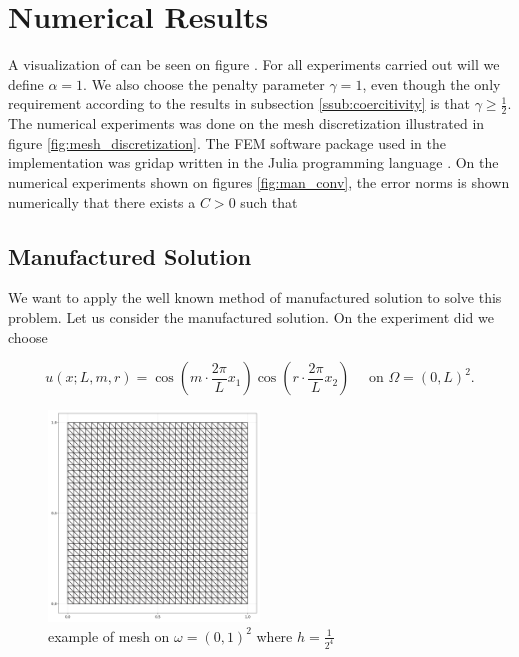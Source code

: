 

\newpage
\section{Numerical Results}%
\label{sec:numerical_results}


A visualization of  can be seen on figure .
For all experiments carried out will we define $\alpha  = 1 $. We also choose the penalty parameter $ \gamma = 1$, even though the only requirement according to the results in subsection \ref{ssub:coercitivity} is that $\gamma \ge  \frac{1}{2}$. The numerical experiments was done on the mesh discretization illustrated in figure \ref{fig:mesh_discretization}.
The FEM software package used in the implementation was gridap written in the Julia programming language \cite{verdugo22, julia17}.
On the numerical experiments shown on figures \ref{fig:man_conv},  the error norms is shown numerically that there exists a $C > 0$ such
that


\newpage
\subsection{Manufactured Solution}%
\label{sub:manufactured_solution}
We want to apply the well known method of manufactured solution to solve this problem.
Let us consider the manufactured solution. On the experiment did we choose

\begin{equation}
    \label{eq:man_sol}
u\left( x; L,m,r \right) = \cos\left(  m\cdot \frac{2\pi}{L}  x_{1}\right)  \cos \left(r\cdot  \frac{2\pi}{L} x_{2} \right) \quad \text{ on }   \Omega =  \left( 0,L  \right)^{2}
.\end{equation}

\begin{figure}[tbh!]
    \centering
    \includegraphics[width=0.5\textwidth]{figures/model/l_1.0_m_1_r_1n_30_grid.png}
    \caption{example of mesh on $ \omega =  \left( 0,1  \right)^{2}$ where $h=\frac{1}{2^{4}}$  }
    \label{fig:sol_l1_m1_r1}
\end{figure}



